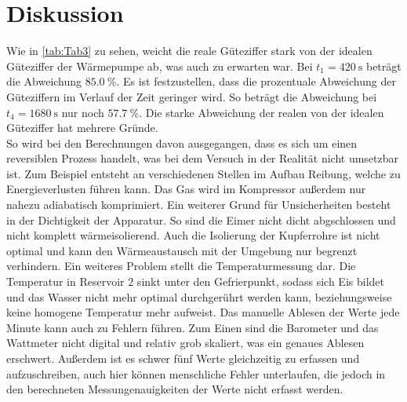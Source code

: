 \section{Diskussion}
\label{sec:Diskussion}

Wie in \autoref{tab:Tab3} zu sehen, weicht die reale Güteziffer stark von der idealen Güteziffer der Wärmepumpe ab, was auch zu erwarten war.
Bei $t_1=\qty{420}{\second}$ beträgt die Abweichung $\qty{85.0}{\percent}$. Es ist festzustellen, dass die prozentuale Abweichung der Güteziffern
im Verlauf der Zeit geringer wird. So beträgt die Abweichung bei $t_4=\qty{1680}{\second}$ nur noch $\qty{57.7}{\percent}$.
Die starke Abweichung der realen von der idealen Güteziffer hat mehrere Gründe.\\
So wird bei den Berechnungen davon ausgegangen, dass es sich um einen reversiblen Prozess handelt, was bei dem Versuch in der Realität nicht umsetzbar ist.
Zum Beispiel entsteht an verschiedenen Stellen im Aufbau Reibung, welche zu Energieverlusten führen kann.
Das Gas wird im Kompressor außerdem nur nahezu adiabatisch komprimiert.
Ein weiterer Grund für Unsicherheiten besteht in der Dichtigkeit der Apparatur. So sind die Eimer nicht dicht abgschlossen und nicht komplett wärmeisolierend.
Auch die Isolierung der Kupferrohre ist nicht optimal und kann den Wärmeaustausch mit der Umgebung nur begrenzt verhindern.
Ein weiteres Problem stellt die Temperaturmessung dar. Die Temperatur in Reservoir 2 sinkt unter den Gefrierpunkt, sodass sich Eis bildet und das Wasser
nicht mehr optimal durchgerührt werden kann, beziehungsweise keine homogene Temperatur mehr aufweist.
Das manuelle Ablesen der Werte jede Minute kann auch zu Fehlern führen. Zum Einen sind die Barometer und das Wattmeter nicht digital und relativ grob skaliert, was ein
genaues Ablesen erschwert. Außerdem ist es schwer fünf Werte gleichzeitig zu erfassen und aufzuschreiben, auch hier können menschliche Fehler unterlaufen,
die jedoch in den berechneten Messungenauigkeiten der Werte nicht erfasst werden.

